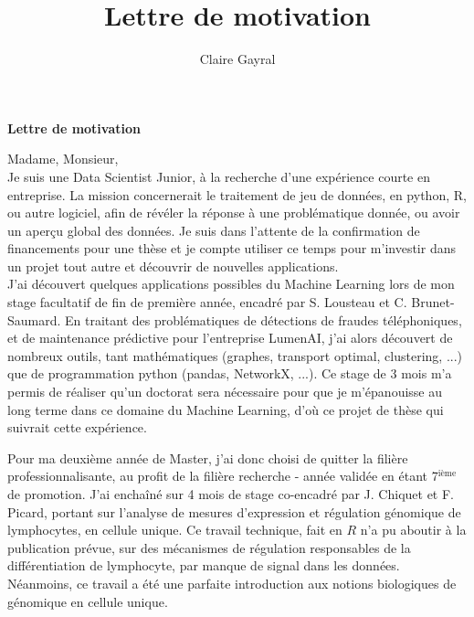 \documentclass[a4paper,11pt]{article}
\title{Lettre de motivation}
\author{Claire Gayral}
\date{}
\begin{document}
{\centering \Large \bf Lettre de motivation \\ \vspace{0.6cm} }

Madame, Monsieur, 
\\

Je suis une Data Scientist Junior, à la recherche d'une expérience courte en entreprise. La mission concernerait le traitement de jeu de données, en python, R, ou autre logiciel, afin de révéler la réponse à une problématique donnée, ou avoir un aperçu global des données. 
Je suis dans l'attente de la confirmation de financements pour une thèse et je compte utiliser ce temps pour m'investir dans un projet tout autre et découvrir de nouvelles applications. \\

J'ai découvert quelques applications possibles du Machine Learning lors de mon stage facultatif de fin de première année, encadré par S. Lousteau et C. Brunet-Saumard.
En traitant des problématiques de détections de fraudes téléphoniques, et de maintenance prédictive pour l'entreprise LumenAI, j'ai alors découvert de nombreux outils, tant mathématiques (graphes, transport optimal, clustering, ...) que de programmation python (pandas, NetworkX, ...). 
Ce stage de 3 mois m'a permis de réaliser qu'un doctorat sera nécessaire pour que je m'épanouisse au long terme dans ce domaine du Machine Learning, d'où ce projet de thèse qui suivrait cette expérience. 

Pour ma deuxième année de Master, j'ai donc choisi de quitter la filière professionnalisante, au profit de la filière recherche - année validée en étant 7$^{\text{ième}}$ de promotion. 
J'ai enchaîné sur 4 mois de stage co-encadré par J. Chiquet et F. Picard, portant sur l'analyse de mesures d'expression et régulation génomique de lymphocytes, en cellule unique. Ce travail technique, fait en $R$ n'a pu aboutir à la publication prévue, sur des mécanismes de régulation responsables de la différentiation de lymphocyte, par manque de signal dans les données. Néanmoins, ce travail a été une parfaite introduction aux notions biologiques de génomique en cellule unique.
%
%
\end{document}
